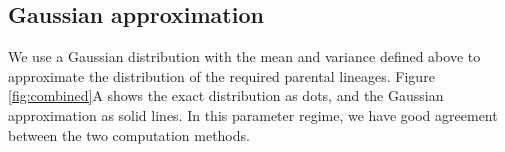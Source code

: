 \documentclass[review]{elsarticle}
\newcommand{\sgcomment}[1]{{\color{red}{SG: #1}}}
\begin{document}

\subsection{Gaussian approximation}



We use a Gaussian distribution with the mean and variance defined above to approximate the
distribution of the required parental lineages. Figure \ref{fig:combined}A shows the exact
distribution as dots, and the Gaussian approximation as solid lines. In this parameter regime, we
have good agreement between the two computation methods.
\end{document}
